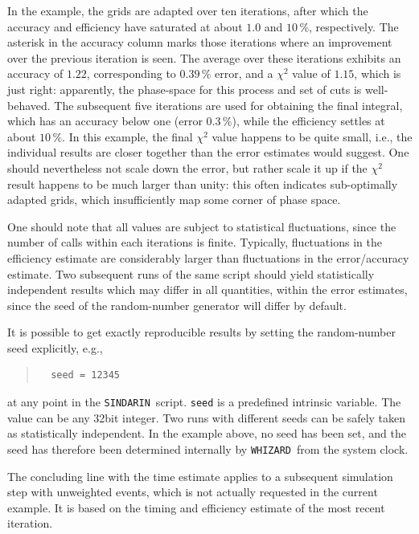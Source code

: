 \documentclass[12pt]{book}
\newcommand{\ttt}[1]{\texttt{#1}}
\newcommand{\whizard}{\ttt{WHIZARD}}
\newcommand{\sindarin}{\ttt{SINDARIN}}
\begin{document}
In the example, the grids are adapted over ten iterations, after which the
accuracy and efficiency have saturated at about $1.0$ and $10\,\%$,
respectively.  The asterisk in the accuracy column marks those iterations
where an improvement over the previous iteration is seen.  The average over
these iterations exhibits an accuracy of $1.22$, corresponding to $0.39\,\%$
error, and a $\chi^2$ value of $1.15$, which is just right:
apparently, the phase-space for this process and set of cuts is
well-behaved.  The subsequent five iterations are used for obtaining
the final integral, which has an accuracy below one (error $0.3\,\%$),
while the efficiency settles at about
$10\,\%$.  In this example, the final $\chi^2$ value happens to be quite
small, i.e., the individual results are closer together than the error
estimates would suggest.  One should nevertheless not scale down the error,
but rather scale it up if the $\chi^2$ result happens to be much larger than
unity: this often indicates sub-optimally adapted grids, which insufficiently
map some corner of phase space.

One should note that all values are subject to statistical fluctuations, since
the number of calls within each iterations is finite.  Typically, fluctuations
in the efficiency estimate are considerably larger than fluctuations in the
error/accuracy estimate.  Two subsequent runs of the same script should yield
statistically independent results which may differ in all quantities, within
the error estimates, since the seed of the random-number generator will differ
by default.

It is possible to get exactly reproducible results by setting the
random-number seed explicitly, e.g.,
\begin{quote}
\begin{footnotesize}
\begin{verbatim}
  seed = 12345
\end{verbatim}
\end{footnotesize}
\end{quote}
at any point in the \sindarin\ script.  \ttt{seed} is a predefined intrinsic
variable.  The value can be any 32bit integer.  Two runs with different seeds
can be safely taken as statistically independent. In the example
above, no seed has been set, and the seed has therefore been
determined internally by \whizard\ from the system clock.

The concluding line with the time estimate applies to a subsequent simulation
step with unweighted events, which is not actually requested in the current
example.  It is based on the timing and efficiency estimate of the most recent
iteration.
\end{document}
